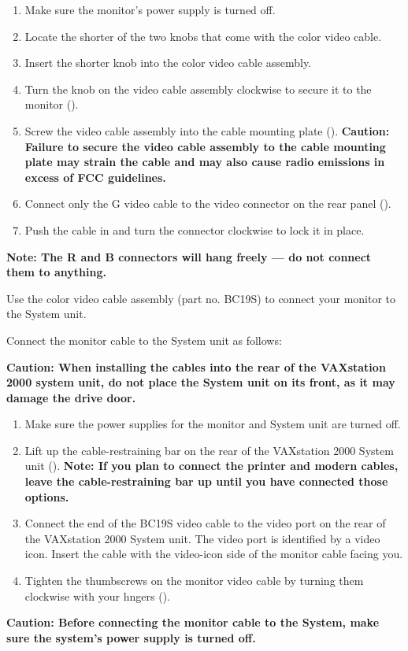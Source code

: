 \documentclass{dec}
\begin{document}
\begin{enumerate}
\item Make sure the monitor's power supply is turned off.
\item Locate the shorter of the two knobs that come with the color video cable.
\item Insert the shorter knob into the color video cable assembly.
\item Turn the knob on the video cable assembly clockwise to secure it to the monitor ().
\item Screw the video cable assembly into the cable mounting plate ().
\textbf{Caution: Failure to secure the video cable assembly to the cable
mounting plate may strain the cable and may also cause radio
emissions in excess of FCC guidelines.}
\item Connect only the G video cable to the video connector on the rear panel
().
\item Push the cable in and turn the connector clockwise to lock it in place.
\end{enumerate}
\textbf{Note: The R and B connectors will hang freely — do not connect them
to anything.}


Use the color video cable assembly (part no. BC19S) to connect your monitor
to the System unit.

Connect the monitor cable to the System unit as follows:

\textbf{Caution: When installing the cables into the rear of the VAXstation 2000
system unit, do not place the System unit on its front, as it may damage
the drive door.}

\begin{enumerate}
\item Make sure the power supplies for the monitor and System unit are turned
off.
\item  Lift up the cable-restraining bar on the rear of the VAXstation 2000 System
unit ().
\textbf{Note: If you plan to connect the printer and modern cables, leave the
cable-restraining bar up until you have connected those options.}
\item Connect the end of the BC19S video cable to the video port on the rear
of the VAXstation 2000 System unit.
 The video port is identified by a
video icon. Insert the cable with the video-icon side of the monitor cable
facing you.
\item Tighten the thumbscrews on the monitor video cable by turning them
clockwise with your hngers ().
\end{enumerate}
\textbf{Caution: Before connecting the monitor cable to the System, make sure
the system's power supply is turned off.}
\end{document}
